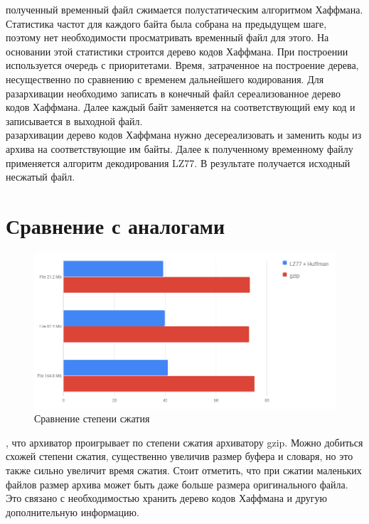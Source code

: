 \documentclass[14pt]{article}
\begin{document}
 полученный временный файл сжимается полустатическим алгоритмом Хаффмана. Статистика частот для каждого байта была собрана на предыдущем шаге, поэтому нет необходимости просматривать временный файл для этого. На основании этой статистики строится дерево кодов Хаффмана. При построении используется очередь с приоритетами.  Время, затраченное на построение дерева, несущественно по сравнению с временем дальнейшего кодирования. Для разархивации необходимо записать в конечный файл сереализованное дерево кодов Хаффмана. Далее каждый байт заменяется на соответствующий ему код и записывается в выходной файл. \\

 разархивации дерево кодов Хаффмана нужно десереализовать и заменить коды из архива на соответствующие им байты. Далее к полученному временному файлу применяется алгоритм декодирования LZ77. В результате получается исходный несжатый файл.

\pagebreak

\section*{Сравнение с аналогами}

\begin{figure}[h]
\centering
\includegraphics[width=1\linewidth]{21.png}
\caption{Сравнение степени сжатия}
\label{fig:mpr}
\end{figure}

, что архиватор проигрывает по степени сжатия архиватору gzip. Можно добиться схожей степени сжатия, существенно увеличив размер буфера и словаря, но это также сильно увеличит время сжатия. Стоит отметить, что при сжатии маленьких файлов размер архива может быть даже больше размера оригинального файла. Это связано с необходимостью хранить дерево кодов Хаффмана и другую дополнительную информацию.
\end{document}

